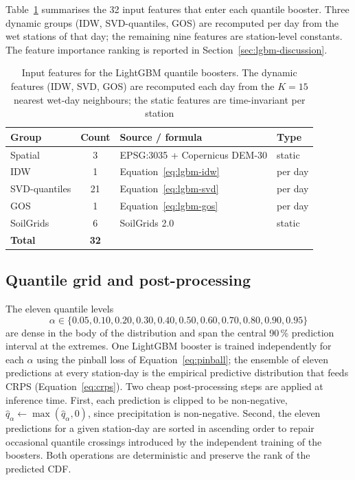 Table~\ref{tab:lgbm-features} summarises the 32 input features that
enter each quantile booster. Three dynamic groups (IDW, SVD-quantiles,
GOS) are recomputed per day from the wet stations of that day; the
remaining nine features are station-level constants. The feature
importance ranking is reported in Section~\ref{sec:lgbm-discussion}.

\begin{table}[ht]
  \centering
  \caption{Input features for the LightGBM quantile boosters. The
  dynamic features (IDW, SVD, GOS) are recomputed each day from the
  $K = 15$ nearest wet-day neighbours; the static features are
  time-invariant per station}
  \label{tab:lgbm-features}
  \begin{tabular}{l c l l}
    \toprule
    Group              & Count & Source / formula
                                        & Type     \\
    \midrule
    Spatial            & 3     & EPSG:3035 + Copernicus DEM-30
                                        & static   \\
    IDW                & 1     & Equation~\eqref{eq:lgbm-idw}
                                        & per day  \\
    SVD-quantiles      & 21    & Equation~\eqref{eq:lgbm-svd}
                                        & per day  \\
    GOS                & 1     & Equation~\eqref{eq:lgbm-gos}
                                        & per day  \\
    SoilGrids          & 6     & SoilGrids 2.0 \cite{poggio2021soilgrids}
                                        & static   \\
    \midrule
    \textbf{Total}     & \textbf{32} &
                                        &          \\
    \bottomrule
  \end{tabular}
\end{table}

\subsection{Quantile grid and post-processing}
\label{sec:lgbm-quantiles}

The eleven quantile levels
\[
  \alpha \in
    \{0{.}05, 0{.}10, 0{.}20, 0{.}30, 0{.}40, 0{.}50,
      0{.}60, 0{.}70, 0{.}80, 0{.}90, 0{.}95\}
\]
are dense in the body of the distribution and span the central
90\,\% prediction interval at the extremes. One LightGBM booster is
trained independently for each $\alpha$ using the pinball loss of
Equation~\eqref{eq:pinball}; the ensemble of eleven predictions at
every station-day is the empirical predictive distribution that
feeds CRPS (Equation~\eqref{eq:crps}). Two cheap post-processing steps
are applied at inference time. First, each prediction is clipped to
be non-negative,
$\hat{q}_\alpha \leftarrow \max(\hat{q}_\alpha, 0)$, since
precipitation is non-negative. Second, the eleven predictions for a
given station-day are sorted in ascending order to repair occasional
quantile crossings introduced by the independent training of the
boosters. Both operations are deterministic and preserve the rank of
the predicted CDF.

